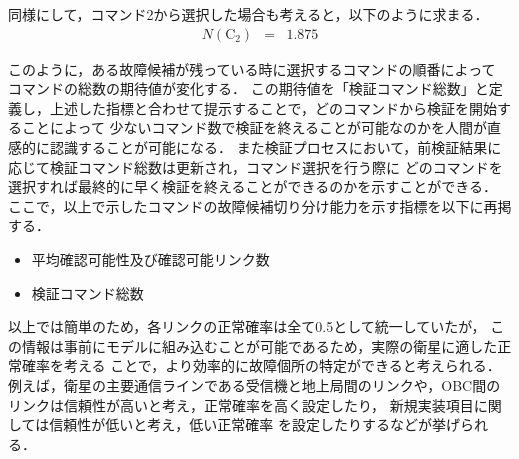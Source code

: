 \documentclass[11pt]{jsreport}
\begin{document}
同様にして，コマンド2から選択した場合も考えると，以下のように求まる．
\begin{eqnarray}
   N(\text{C}_2)  &=& 1.875 %
\end{eqnarray}

このように，ある故障候補が残っている時に選択するコマンドの順番によって
コマンドの総数の期待値が変化する．
この期待値を「検証コマンド総数」と定義し，上述した指標と合わせて提示することで，どのコマンドから検証を開始することによって
少ないコマンド数で検証を終えることが可能なのかを人間が直感的に認識することが可能になる．
また検証プロセスにおいて，前検証結果に応じて検証コマンド総数は更新され，コマンド選択を行う際に
どのコマンドを選択すれば最終的に早く検証を終えることができるのかを示すことができる．\\
ここで，以上で示したコマンドの故障候補切り分け能力を示す指標を以下に再掲する．
\begin{itemize}
   \item 平均確認可能性及び確認可能リンク数
   \item 検証コマンド総数
\end{itemize}

以上では簡単のため，各リンクの正常確率は全て0.5として統一していたが，
この情報は事前にモデルに組み込むことが可能であるため，実際の衛星に適した正常確率を考える
ことで，より効率的に故障個所の特定ができると考えられる．
例えば，衛星の主要通信ラインである受信機と地上局間のリンクや，OBC間の
リンクは信頼性が高いと考え，正常確率を高く設定したり，
新規実装項目に関しては信頼性が低いと考え，低い正常確率
を設定したりするなどが挙げられる．
\end{document}
